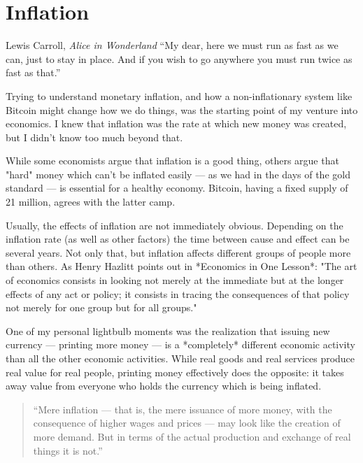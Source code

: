\chapter{ Inflation}
\label{les:9}

\begin{chapquote}{Lewis Carroll, \textit{Alice in Wonderland}}
``My dear, here we must run as fast as we can, just to stay in place. And if you
wish to go anywhere you must run twice as fast as that.''
\end{chapquote}

Trying to understand monetary inflation, and how a non-inflationary
system like Bitcoin might change how we do things, was the starting
point of my venture into economics. I knew that inflation was the rate
at which new money was created, but I didn't know too much beyond that.

While some economists argue that inflation is a good thing, others argue
that "hard" money which can't be inflated easily --- as we had in the
days of the gold standard --- is essential for a healthy economy.
Bitcoin, having a fixed supply of 21 million, agrees with the latter
camp.

Usually, the effects of inflation are not immediately obvious. Depending
on the inflation rate (as well as other factors) the time between cause
and effect can be several years. Not only that, but inflation affects
different groups of people more than others. As Henry Hazlitt points out
in *Economics in One Lesson*: "The art of economics consists in looking
not merely at the immediate but at the longer effects of any act or
policy; it consists in tracing the consequences of that policy not
merely for one group but for all groups."

One of my personal lightbulb moments was the realization that issuing
new currency --- printing more money --- is a *completely* different
economic activity than all the other economic activities. While real
goods and real services produce real value for real people, printing
money effectively does the opposite: it takes away value from everyone
who holds the currency which is being inflated.

\begin{quotation}
``Mere inflation --- that is, the mere issuance of more money, with the
consequence of higher wages and prices --- may look like the creation
of more demand. But in terms of the actual production and exchange of
real things it is not.''
\end{quotation}

